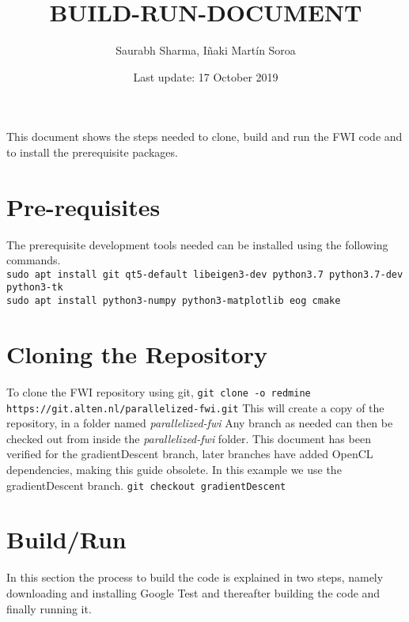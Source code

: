 \documentclass[10pt]{article}
\title{BUILD-RUN-DOCUMENT}
\author{Saurabh Sharma, I\~naki Mart\'in Soroa}
\date{Last update: 17 October 2019}
\begin{document}
\maketitle
\noindent This document shows the steps needed to clone, build and run the FWI code and to install the prerequisite packages. 
\section{Pre-requisites}
The prerequisite development tools needed can be installed using the following commands.\\
\noindent \texttt{sudo apt install git qt5-default libeigen3-dev python3.7 python3.7-dev python3-tk}\\
\texttt{sudo apt install python3-numpy python3-matplotlib eog cmake}  
\section{Cloning the Repository}
\noindent To clone the FWI repository using git,
\newline
\texttt{git clone -o redmine https://git.alten.nl/parallelized-fwi.git}
\newline
This will create a copy of the repository, in a folder named \textit{parallelized-fwi}
\newline
Any branch as needed can then be checked out from inside the \textit{parallelized-fwi} folder. This document has been verified for the gradientDescent branch, later branches have added OpenCL dependencies, making this guide obsolete. In this example we use the gradientDescent branch.
\newline
\texttt{git checkout gradientDescent}
\section{Build/Run}
In this section the process to build the code is explained in two steps, namely downloading and installing Google Test and thereafter building the code and finally running it.  
\end{document}
